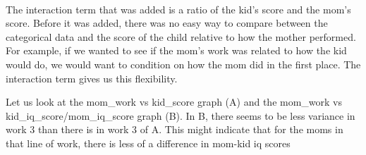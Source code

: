 \documentclass[11pt]{article}
\begin{document}
    \begin{center}
    \end{center}
    { \hspace*{\fill} \\}
    
    The interaction term that was added is a ratio of the kid's score and
the mom's score. Before it was added, there was no easy way to compare
between the categorical data and the score of the child relative to how
the mother performed. For example, if we wanted to see if the mom's work
was related to how the kid would do, we would want to condition on how
the mom did in the first place. The interaction term gives us this
flexibility.

Let us look at the mom\_work vs kid\_score graph (A) and the mom\_work
vs kid\_iq\_score/mom\_iq\_score graph (B). In B, there seems to be less
variance in work 3 than there is in work 3 of A. This might indicate
that for the moms in that line of work, there is less of a difference in
mom-kid iq scores


    
    
    
    
\end{document}
